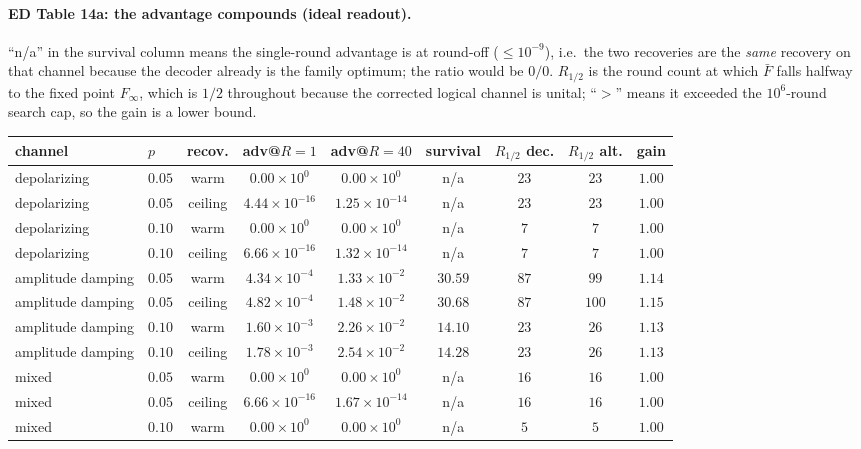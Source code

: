 \documentclass[10pt,a4paper]{article}
\begin{document}
\paragraph*{ED Table 14a: the advantage compounds (ideal readout).}
``n/a'' in the survival column means the single-round advantage is at round-off
($\le10^{-9}$), i.e.\ the two recoveries are the \emph{same} recovery on that
channel because the decoder already is the family optimum; the ratio would be
$0/0$.  $R_{1/2}$ is the round count at which $\bar F$ falls halfway to the fixed
point $F_\infty$, which is $1/2$ throughout because the corrected logical channel
is unital; ``$>$'' means it exceeded the $10^{6}$-round search cap, so the gain is
a lower bound.
\begin{longtable}{llccccccc}
\toprule channel & $p$ & recov. & adv@$R{=}1$ & adv@$R{=}40$ & survival & $R_{1/2}$ dec. & $R_{1/2}$ alt. & gain \\ \midrule
depolarizing & $0.05$ & warm & $0.00\times 10^{0}$ & $0.00\times 10^{0}$ & n/a & $23$ & $23$ & $1.00$ \\
depolarizing & $0.05$ & ceiling & $4.44\times 10^{-16}$ & $1.25\times 10^{-14}$ & n/a & $23$ & $23$ & $1.00$ \\
depolarizing & $0.10$ & warm & $0.00\times 10^{0}$ & $0.00\times 10^{0}$ & n/a & $7$ & $7$ & $1.00$ \\
depolarizing & $0.10$ & ceiling & $6.66\times 10^{-16}$ & $1.32\times 10^{-14}$ & n/a & $7$ & $7$ & $1.00$ \\
amplitude damping & $0.05$ & warm & $4.34\times 10^{-4}$ & $1.33\times 10^{-2}$ & $30.59$ & $87$ & $99$ & $1.14$ \\
amplitude damping & $0.05$ & ceiling & $4.82\times 10^{-4}$ & $1.48\times 10^{-2}$ & $30.68$ & $87$ & $100$ & $1.15$ \\
amplitude damping & $0.10$ & warm & $1.60\times 10^{-3}$ & $2.26\times 10^{-2}$ & $14.10$ & $23$ & $26$ & $1.13$ \\
amplitude damping & $0.10$ & ceiling & $1.78\times 10^{-3}$ & $2.54\times 10^{-2}$ & $14.28$ & $23$ & $26$ & $1.13$ \\
mixed & $0.05$ & warm & $0.00\times 10^{0}$ & $0.00\times 10^{0}$ & n/a & $16$ & $16$ & $1.00$ \\
mixed & $0.05$ & ceiling & $6.66\times 10^{-16}$ & $1.67\times 10^{-14}$ & n/a & $16$ & $16$ & $1.00$ \\
mixed & $0.10$ & warm & $0.00\times 10^{0}$ & $0.00\times 10^{0}$ & n/a & $5$ & $5$ & $1.00$ \\

\end{longtable}
\end{document}
